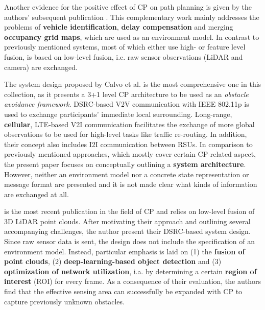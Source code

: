 Another evidence for the positive effect of CP on path planning is given by the authors' subsequent publication \cite{kim2013cooperative}. This complementary work mainly addresses the problems of \textbf{vehicle identification}, \textbf{delay compensation} and merging \textbf{occupancy grid maps}, which are used as an environment model. In contrast to previously mentioned systems, most of which either use high- or feature level fusion, \cite{kim2013cooperative} is based on low-level fusion, i.e. raw sensor observations (LiDAR and camera) are exchanged. 
\par
\bigskip

The system design proposed by Calvo et al. \cite{Calvo2017} is the most comprehensive one in this collection, as it presents a 3+1 level CP architecture to be used as an \textit{obstacle avoidance framework}. DSRC-based V2V communication with IEEE 802.11p is used to exchange participants' immediate local surrounding. Long-range, \textbf{cellular}, LTE-based V2I communication facilitates the exchange of more global observations to be used for high-level tasks like traffic re-routing. In addition, their concept also includes I2I communication between RSUs. In comparison to previously mentioned approaches, which mostly cover certain CP-related aspect, the present paper focuses on conceptually outlining a \textbf{system architecture}. However, neither an environment model nor a concrete state representation or message format are presented and it is not made clear what kinds of information are exchanged at all. 
\par
\bigskip

\cite{Chen2019} is the most recent publication in the field of CP and relies on low-level fusion of 3D LiDAR point clouds. After motivating their approach and outlining several accompanying challenges, the author present their DSRC-based system design. Since raw sensor data is sent, the design does not include the specification of an environment model. Instead, particular emphasis is laid on (1) the \textbf{fusion of point clouds}, (2)\textbf{ deep-learning-based object detection} and (3) \textbf{optimization of network utilization}, i.a. by determining a certain \textbf{region of interest} (ROI) for every frame. As a consequence of their evaluation, the authors find that the effective sensing area can successfully be expanded with CP to capture previously unknown obstacles. 
\par
\bigskip

